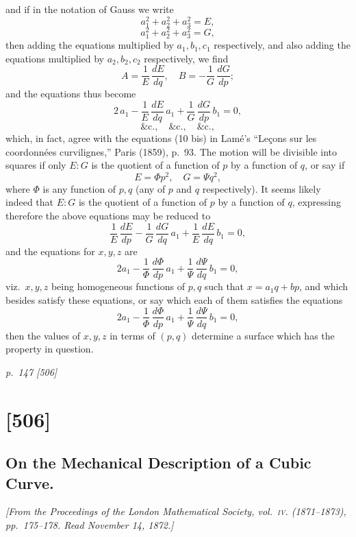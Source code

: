\documentclass[11pt,a4paper]{book}
\begin{document}
\noindent
and if in the notation of Gauss we write
\[
a_1^2 + a_2^2 + a_3^2 = E,
\]
\[
a_1^2 + a_2^2 + a_3^2 = G,
\]
then adding the equations multiplied by $a_1, b_1, c_1$ respectively, and also adding the
equations multiplied by $a_2, b_2, c_2$ respectively, we find
\[
A = \frac{1}{E}\,\frac{dE}{dq}, \quad B = -\frac{1}{G}\,\frac{dG}{dp};
\]
and the equations thus become
\[
2\,a_1 - \frac{1}{E}\,\frac{dE}{dq}\,a_1 + \frac{1}{G}\,\frac{dG}{dp}\,b_1 = 0,
\]
\[
\&\text{c.},\quad \&\text{c.},\quad \&\text{c.},
\]
which, in fact, agree with the equations (10 bis) in Lam\'e's ``Leçons sur les coordonn\'ees
curvilignes,'' Paris (1859), p.\ 93. The motion will be divisible into squares if only
$E : G$ is the quotient of a function of $p$ by a function of $q$, or say if
\[
E = \Phi p^2, \quad G = \Psi q^2,
\]
where $\Phi$ is any function of $p, q$ (any of $p$ and $q$ respectively). It seems likely indeed that
$E : G$ is the quotient of a function of $p$ by a function of $q$, expressing therefore the
above equations may be reduced to
\[
\frac{1}{E}\,\frac{dE}{dp} - \frac{1}{G}\,\frac{dG}{dq}\,a_1 + \frac{1}{E}\,\frac{dE}{dq}\,b_1 = 0,
\]
and the equations for $x, y, z$ are
\[
2 a_1 - \frac{1}{Φ}\,\frac{dΦ}{dp}\,a_1 + \frac{1}{Ψ}\,\frac{dΨ}{dq}\,b_1 = 0,
\]
viz.\ $x, y, z$ being homogeneous functions of $p, q$ such that $x = a_1 q + bp$, and which besides
satisfy these equations, or say which each of them satisfies the equations
\[
2 a_1 - \frac{1}{Φ}\,\frac{dΦ}{dp}\,a_1 + \frac{1}{Ψ}\,\frac{dΨ}{dq}\,b_1 = 0,
\]
then the values of $x, y, z$ in terms of $(p, q)$ determine a surface which has the
property in question.

\clearpage

\bigskip
\textit{p.~147 [506]}
\smallskip

\section{[506]}
\subsection{On the Mechanical Description of a Cubic Curve.}

\begin{center}
\textit{[From the Proceedings of the London Mathematical Society, vol.~\textsc{iv}. (1871--1873), pp.~175--178.  Read November 14, 1872.]}
\end{center}
\end{document}
